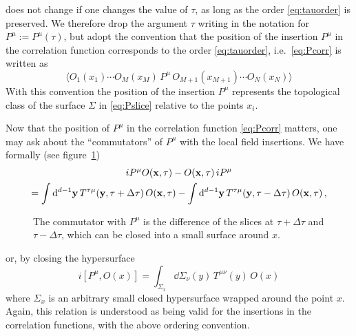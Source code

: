 does not change if one changes the value of $\tau$, as long as the order
\eqref{eq:tauorder} is preserved. We therefore drop the argument $\tau$ writing in
the notation for $P^\mu:=P^\mu(\tau)$, but adopt the convention that the position of
the insertion $P^\mu$ in the correlation function corresponds to the order
\eqref{eq:tauorder}, i.e.\ \eqref{eq:Pcorr} is written as
\begin{equation}\label{eq:Pinsert}
\bigl\langle O_1(x_1)\cdots O_M(x_M)\,P^\mu\,O_{M+1}(x_{M+1})\cdots O_N(x_N)\bigr\rangle
\end{equation}
With this convention the position of the insertion $P^\mu$ represents the
topological class of the surface $\Sigma$ in \eqref{eq:Pslice} relative to the
points $x_i$.

Now that the position of $P^\mu$ in the correlation function \eqref{eq:Pcorr}
matters, one may ask about the ``commutators'' of $P^\mu$ with the local field
insertions. We have formally (see figure~\ref{fig:commslab})
\begin{multline*}
iP^\mu O(\mathbf{x},\tau)-O(\mathbf{x},\tau)\,iP^\mu\\
=\int \mathop{}\!\mathrm{d}^{d-1}\mathbf{y}\,T^{\tau\mu}(\mathbf{y},\tau+\Delta\tau)\,O(\mathbf{x},\tau)-\int \mathop{}\!\mathrm{d}^{d-1}\mathbf{y}\,T^{\tau\mu}(\mathbf{y},\tau-\Delta\tau)\,O(\mathbf{x},\tau)\,,
\end{multline*}
\begin{figure}[ht]
\centering{}
\caption{The commutator with $P^\mu$ is the difference of the slices at
$\tau+\Delta\tau$ and $\tau-\Delta\tau$, which can be closed into a small surface
around $x$.}
\label{fig:commslab}
\end{figure}
or, by closing the hypersurface
\begin{equation}\label{eq:Pcomm}
i[P^\mu,O(x)]=\int_{\Sigma_x}\dd\Sigma_\nu(y)\,T^{\mu\nu}(y)\,O(x)
\end{equation}
where $\Sigma_x$ is an arbitrary small closed hypersurface wrapped around the point
$x$. Again, this relation is understood as being valid for the insertions in the
correlation functions, with the above ordering convention.

